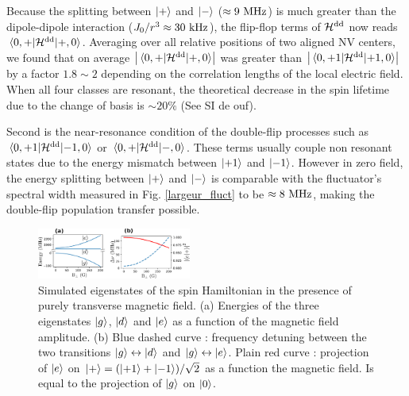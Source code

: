 \documentclass[preprintnumbers,amsmath,amssymb,superscriptaddress,twocolumn,showpacs]{revtex4-2}
\begin{document}
Because the splitting between $\ket{+}$ and $\ket{-}$ ($\approx 9\ \rm MHz$) is much greater than the dipole-dipole interaction ($J_0 / r^3 \approx 30\ \rm kHz$), the flip-flop terms of $\mathcal{H}^{\rm dd}$ now reads $\mel{0,+}{\mathcal{H}^{\rm dd}}{+,0}$. Averaging over all relative positions of two aligned NV centers, we found that on average $\abs{\mel{0,+}{\mathcal{H}^{\rm dd}}{+,0}}$ was greater than 
$\abs{\mel{0,+1}{\mathcal{H}^{\rm dd}}{+1,0}}$ by a factor $1.8 \sim 2$ depending on the correlation lengths of the local electric field.
When all four classes are resonant, the theoretical decrease in the spin lifetime due to the change of basis is $\sim 20 \%$ (See SI de ouf).

Second is the near-resonance condition of the double-flip processes such as $\mel{0,+1}{\mathcal{H}^{\rm dd}}{-1,0}$ or $\mel{0,+}{\mathcal{H}^{\rm dd}}{-,0}$. These terms usually couple non resonant states due to the energy mismatch between $\ket{+1}$ and $\ket{-1}$. However in zero field, the energy splitting between $\ket{+}$ and $\ket{-}$ is comparable with the fluctuator's spectral width measured in Fig. \ref{largeur_fluct} to be $\approx 8\ \rm MHz$, making the double-flip population transfer possible.

\begin{figure}
\includegraphics[width=0.45\textwidth]{Figures/fig transverse field simu}
\caption{Simulated eigenstates of the spin Hamiltonian in the presence of purely transverse magnetic field. (a) Energies of the three eigenstates $\ket{g}$, $\ket{d}$ and $\ket{e}$ as a function of the magnetic field amplitude. (b) Blue dashed curve : frequency detuning between the two transitions $\ket{g} \leftrightarrow \ket{d}$ and $\ket{g} \leftrightarrow \ket{e}$. Plain red curve : projection of $\ket{e}$ on $\ket{+}=(\ket{+1}+\ket{-1})/\sqrt{2}$ as a function the magnetic field. Is equal to the projection of $\ket{g}$ on $\ket{0}$.}
\label{calculs_B_transverse}
\end{figure}
\end{document}
